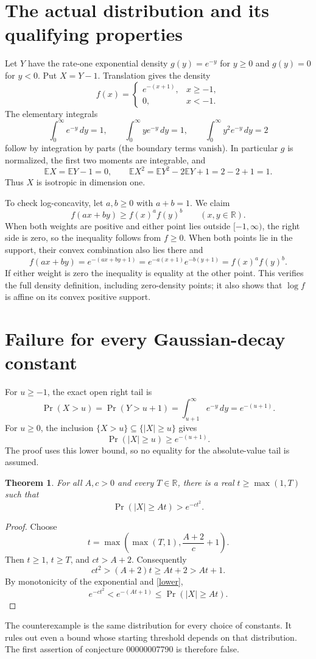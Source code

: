 \documentclass[11pt]{article}
\newtheorem{theorem}{Theorem}
\begin{document}
\section{The actual distribution and its qualifying properties}
Let $Y$ have the rate-one exponential density $g(y)=e^{-y}$ for $y\geq0$ and $g(y)=0$ for $y<0$. Put $X=Y-1$. Translation gives the density
\[
 f(x)=\begin{cases}e^{-(x+1)},&x\geq-1,\\0,&x<-1.\end{cases}
\]
The elementary integrals
\[
 \int_0^\infty e^{-y}\,dy=1,\qquad
 \int_0^\infty ye^{-y}\,dy=1,\qquad
 \int_0^\infty y^2e^{-y}\,dy=2
\]
follow by integration by parts (the boundary terms vanish). In particular $g$ is normalized, the first two moments are integrable, and
\[
 \mathbb EX=\mathbb EY-1=0,\qquad
 \mathbb EX^2=\mathbb EY^2-2\mathbb EY+1=2-2+1=1.
\]
Thus $X$ is isotropic in dimension one.

To check log-concavity, let $a,b\geq0$ with $a+b=1$. We claim
\[
 f(ax+by)\geq f(x)^a f(y)^b \qquad(x,y\in\mathbb R).
\]
When both weights are positive and either point lies outside $[-1,\infty)$, the right side is zero, so the inequality follows from $f\geq0$. When both points lie in the support, their convex combination also lies there and
\[
 f(ax+by)=e^{-(ax+by+1)}
 =e^{-a(x+1)}e^{-b(y+1)}=f(x)^a f(y)^b.
\]
If either weight is zero the inequality is equality at the other point. This verifies the full density definition, including zero-density points; it also shows that $\log f$ is affine on its convex positive support.

\section{Failure for every Gaussian-decay constant}
For $u\geq-1$, the exact open right tail is
\[
 \Pr(X>u)=\Pr(Y>u+1)=\int_{u+1}^\infty e^{-y}\,dy=e^{-(u+1)}.
\]
For $u\geq0$, the inclusion $\{X>u\}\subseteq\{|X|\geq u\}$ gives
\begin{equation}\label{lower}
 \Pr(|X|\geq u)\geq e^{-(u+1)}.
\end{equation}
The proof uses this lower bound, so no equality for the absolute-value tail is assumed.

\begin{theorem}
For all $A,c>0$ and every $T\in\mathbb R$, there is a real $t\geq\max(1,T)$ such that
\[
 \Pr(|X|\geq At)>e^{-ct^2}.
\]
\end{theorem}
\begin{proof}
Choose
\[
 t=\max\!\left(\max(T,1),\frac{A+2}{c}+1\right).
\]
Then $t\geq1$, $t\geq T$, and $ct>A+2$. Consequently
\[
 ct^2>(A+2)t\geq At+2>At+1.
\]
By monotonicity of the exponential and \eqref{lower},
\[
 e^{-ct^2}<e^{-(At+1)}\leq\Pr(|X|\geq At).
\]
\end{proof}
The counterexample is the same distribution for every choice of constants. It rules out even a bound whose starting threshold depends on that distribution. The first assertion of conjecture 00000007790 is therefore false.
\end{document}
